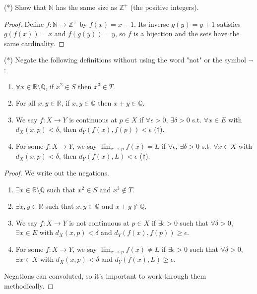 \documentclass[12pt]{article}
\begin{document}
\begin{problem}
(*) Show that $\mathbb{N}$ has the same size as $\mathbb{Z}^+$ (the positive integers).

\begin{proof}
Define $f:\mathbb{N}\to\mathbb{Z}^+$ by $f(x)=x-1$. Its inverse $g(y)=y+1$ satisfies $g(f(x))=x$ and $f(g(y))=y$, so $f$ is a bijection and the sets have the same cardinality.
\end{proof}
\end{problem}

\begin{problem}
(*) Negate the following definitions without using the word "not" or the symbol $\lnot$:
\begin{enumerate}
\item $\forall x \in \mathbb{R} \setminus \mathbb{Q}$, if $x^2 \in S$ then $x^3 \in T$.
\item For all $x,y \in \mathbb{R}$, if $x,y \in \mathbb{Q}$ then $x + y \in \mathbb{Q}$.
\item We say $f : X \to Y$ is continuous at $p \in X$ if $\forall \epsilon > 0$, $\exists \delta > 0$ s.t. $\forall x \in E$ with $d_X(x,p) < \delta$, then $d_Y(f(x),f(p)) < \epsilon$ ($\dagger$).
\item For some $f: X \to Y$, we say $\lim_{x \to p} f(x) = L$ if $\forall \epsilon$, $\exists \delta > 0$ s.t. $\forall x \in X$ with $d_X(x,p) < \delta$, then $d_Y(f(x),L) < \epsilon$ ($\dagger$).
\end{enumerate}

\begin{proof} We write out the negations. 
\begin{enumerate}
    \item $\exists x \in \mathbb{R} \setminus \mathbb{Q}$ such that $x^2 \in S$ and $x^3 \notin T$.
    
    \item $\exists x,y \in \mathbb{R}$ such that $x,y \in \mathbb{Q}$ and $x + y \notin \mathbb{Q}$.
    
    \item We say $f : X \to Y$ is not continuous at $p \in X$ if $\exists \epsilon > 0$ such that $\forall \delta > 0$, $\exists x \in E$ with $d_X(x,p) < \delta$ and $d_Y(f(x),f(p)) \geq \epsilon$.
    
    \item For some $f: X \to Y$, we say $\lim_{x \to p} f(x) \neq L$ if $\exists \epsilon > 0$ such that $\forall \delta > 0$, $\exists x \in X$ with $d_X(x,p) < \delta$ and $d_Y(f(x),L) \geq \epsilon$.
\end{enumerate}
Negations can convoluted, so it's important to work through them methodically.
\end{proof}
\end{problem}
\end{document}
